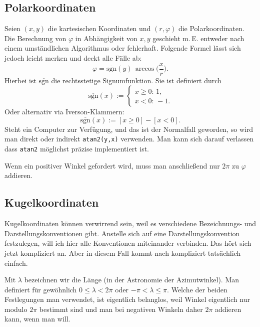 \documentclass[a4paper,11pt,fleqn]{article}
\begin{document}
\subsection{Polarkoordinaten}
Seien $(x,y)$ die kartesischen Koordinaten und $(r,\varphi)$
die Polarkoordinaten. Die Berechnung von $\varphi$ in
Abhängigkeit von $x,y$ geschieht m.\,E. entweder nach
einem umständlichen Algorithmus oder fehlerhaft.
Folgende Formel lässt sich jedoch leicht merken und deckt
alle Fälle ab:
\begin{equation}
\varphi = \overline{\mathrm{sgn}}(y)\,\arccos\Big(\frac{x}{r}\Big).
\end{equation}
Hierbei ist $\overline{\mathrm{sgn}}$ die rechtsstetige
Signumfunktion. Sie ist definiert durch
\begin{equation}
\overline{\mathrm{sgn}}(x):=
\begin{cases}
x{\ge}0\colon\,1,\\
x{<}0\colon\,{-}1.
\end{cases}
\end{equation}
Oder alternativ via Iverson-Klammern:
\begin{equation}
\overline{\mathrm{sgn}}(x):=[x{\ge}0]-[x{<}0].
\end{equation}
Steht ein Computer zur Verfügung, und das ist der Normalfall geworden,
so wird man direkt oder indirekt \verb|atan2(y,x)| verwenden.
Man kann sich darauf verlassen dass \verb|atan2| möglichst präzise
implementiert ist.

Wenn ein positiver Winkel gefordert wird, muss man
anschließend nur $2\pi$ zu $\varphi$ addieren.


\subsection{Kugelkoordinaten}

Kugelkoordinaten können verwirrend sein, weil es verschiedene
Bezeichnungs- und Darstellungskonventionen gibt. Anstelle sich auf eine
Darstellungskonvention festzulegen, will ich hier alle Konventionen
miteinander verbinden. Das hört sich jetzt kompliziert an. Aber in
diesem Fall kommt nach kompliziert tatsächlich einfach.

Mit $\lambda$ bezeichnen wir die Länge (in der Astronomie der
Azimutwinkel). Man definiert für gewöhnlich $0\le\lambda<2\pi$ oder
$-\pi<\lambda\le\pi$. Welche der beiden Festlegungen man verwendet,
ist eigentlich belanglos, weil Winkel eigentlich nur modulo $2\pi$
bestimmt sind und man bei negativen Winkeln daher $2\pi$ addieren
kann, wenn man will.
\end{document}
